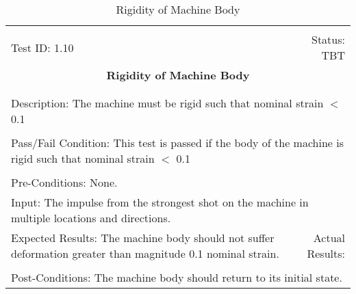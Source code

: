 \documentclass[titlepage]{article}
\begin{document}
\begin{center}%
\begin{table}[h!]
\begin{tabular}{|l r|}\hline&\\[-2mm]
	Test ID:   1.10	&Status: TBT\\[-3mm]
	\multicolumn{2}{|c|}{\textbf{\large{Rigidity of Machine Body}}}\\&\\\hline&\\[-3mm]
	\multicolumn{2}{|p{\textwidth}|}{Description: The machine must be rigid such that nominal strain $<$ 0.1}\\[1mm]\hline&\\[-3mm]
	\multicolumn{2}{|p{\textwidth}|}{Pass/Fail Condition: This test is passed if the body of the machine is rigid such that nominal strain $<$ 0.1}\\[1mm]\hline&\\[-3mm]
	\multicolumn{2}{|p{\textwidth}|}{Pre-Conditions: None.}\\[4mm]
	\multicolumn{2}{|p{\textwidth}|}{Input: The impulse from the strongest shot on the machine in multiple locations and directions.}\\[2mm]\hline
	\multicolumn{1}{|p{0.49\textwidth}}{Expected Results: The machine body should not suffer deformation greater than magnitude 0.1 nominal strain.}	&\multicolumn{1}{|p{0.45\textwidth}|}{Actual Results:}\\\hline&\\[-3mm]
	\multicolumn{2}{|p{\textwidth}|}{Post-Conditions: The machine body should return to its initial state.}\\\hline
\end{tabular}
\caption{Rigidity of Machine Body}
\end{table}
\end{center}
\end{document}
